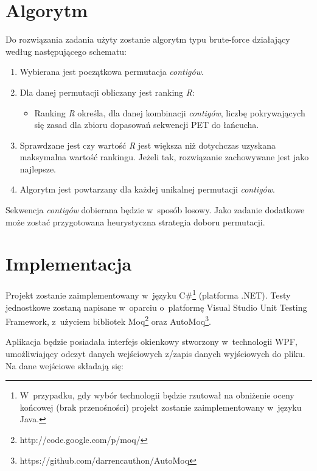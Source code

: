 \documentclass[a4paper,10pt]{article}
\begin{document}
\section*{Algorytm}

Do rozwiązania zadania użyty zostanie algorytm typu brute-force działający według następującego schematu:

\begin{enumerate}
 \item Wybierana jest początkowa permutacja \emph{contigów}.
 \item Dla danej permutacji obliczany jest ranking \emph{R}:
   \begin{itemize}
    \item Ranking \emph{R} określa, dla danej kombinacji \emph{contigów}, liczbę pokrywających się zasad dla zbioru dopasowań sekwencji PET do łańcucha.
   \end{itemize}
 \item Sprawdzane jest czy wartość \emph{R} jest większa niż dotychczas uzyskana maksymalna wartość rankingu. Jeżeli tak, rozwiązanie zachowywane jest jako najlepsze.
 \item Algorytm jest powtarzany dla każdej unikalnej permutacji \emph{contigów}.
\end{enumerate}

Sekwencja \emph{contigów} dobierana będzie w~sposób losowy. Jako zadanie dodatkowe może zostać przygotowana heurystyczna strategia doboru permutacji.
 
\section*{Implementacja}

Projekt zostanie zaimplementowany w~języku C\#\footnote{W~przypadku, gdy wybór technologii będzie rzutował na obniżenie oceny końcowej (brak przenośności) projekt zostanie zaimplementowany w~języku Java.} (platforma .NET). Testy jednostkowe zostaną napisane w~oparciu o~platformę Visual Studio Unit Testing Framework, z~użyciem bibliotek Moq\footnote{http://code.google.com/p/moq/} oraz AutoMoq\footnote{https://github.com/darrencauthon/AutoMoq}.

Aplikacja będzie posiadała interfejs okienkowy stworzony w~technologii WPF, umożliwiający odczyt danych wejściowych z/zapis danych wyjściowych do pliku. Na dane wejściowe składają się:
\end{document}
